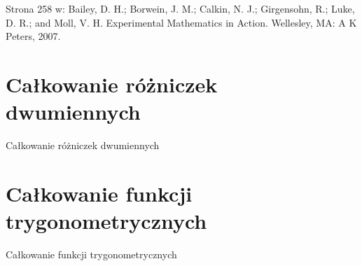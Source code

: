 \documentclass{parchment}
\begin{document}
\begin{solution}
    Strona 258 w: Bailey, D. H.; Borwein, J. M.; Calkin, N. J.; Girgensohn, R.; Luke, D. R.; and Moll, V. H. Experimental Mathematics in Action. Wellesley, MA: A K Peters, 2007.
\end{solution}

\section{Całkowanie różniczek dwumiennych}
Całkowanie różniczek dwumiennych

\section{Całkowanie funkcji trygonometrycznych}
Całkowanie funkcji trygonometrycznych



{}

\end{document}
